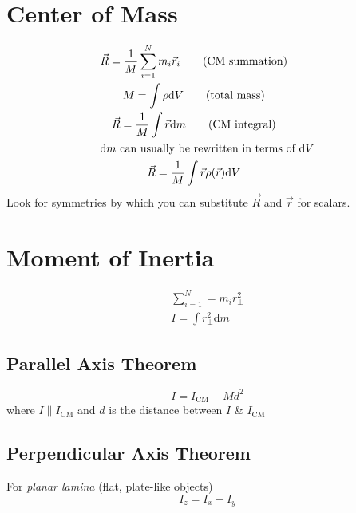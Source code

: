 \documentclass{cheatsheet}
\begin{document}
	\section{Center of Mass}
	\begin{gather*}
		\vec R = \frac{1}{M}\sum_{i=1}^N m_i \vec r_i	\tag{CM summation}\raisetag{-10pt}\\
		M = \int \rho \mathrm{d}V	\tag{total mass}\\
		\vec R =  \frac{1}{M}  \int \vec r \mathrm{d}m \tag{CM integral}\raisetag{-6pt}\\
	\intertext{$\mathrm{d}m$ can usually be rewritten in terms of $\mathrm{d}V$}
		\vec R = \frac{1}{M} \int \vec r \rho(\vec r) \mathrm{d}V
	\end{gather*}
	Look for symmetries by which you can substitute $\vec R$ and $\vec r$ for scalars.

	\section{Moment of Inertia}
	\begin{gather*}
		\sum_{i=1}^{N} = m_i r^2_\perp \tag{summation}\\
		I = \int r^2_\perp \mathrm{d}m	\tag{integral}
	\end{gather*}
		\subsection{Parallel Axis Theorem}
			\[ I = I_\mathrm{CM} + Md^2 \]
			where $I \parallel I_\mathrm{CM}$ and $d$ is the distance between $I$ \& $I_\mathrm{CM}$

		\subsection{Perpendicular Axis Theorem}
			For \emph{planar lamina} (flat, plate-like objects)
			\[ I_z = I_x + I_y \]
\end{document}
